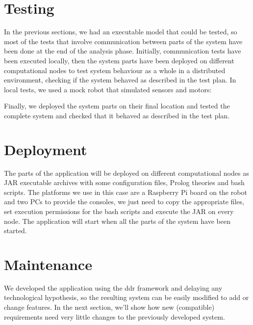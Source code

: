 \documentclass{llncs}
\newcommand{\labelsec}[1]{\label{sec:#1}}
\begin{document}
\section{Testing}
\labelsec{testing}
In the previous sections, we had an executable model that could be tested, so most of the tests that involve communication between parts of the system have been done at the end of the analysis phase. Initially, communication tests have been executed locally, then the system parts have been deployed on different computational nodes to test system behaviour as a whole in a distributed environment, checking if the system behaved as described in the test plan.
In local tests, we used a mock robot that simulated sensors and motors:

Finally, we deployed the system parts on their final location and tested the complete system and checked that it behaved as described in the test plan.
\section{Deployment}
\labelsec{Deployment}
The parts of the application will be deployed on different computational nodes as JAR executable archives with some configuration files, Prolog theories and bash scripts.
The platforms we use in this case are a Raspberry Pi board on the robot and two PCs to provide the consoles, we just need to copy the appropriate files, set execution permissions for the bash scripts and execute the JAR on every node. The application will start when all the parts of the system have been started.
\section{Maintenance}
\labelsec{Maintenance}
We developed the application using the ddr framework and delaying any technological hypothesis, so the resulting system can be easily modified to add or change features. In the next section, we'll show how new (compatible) requirements need very little changes to the previously developed system.
\end{document}
